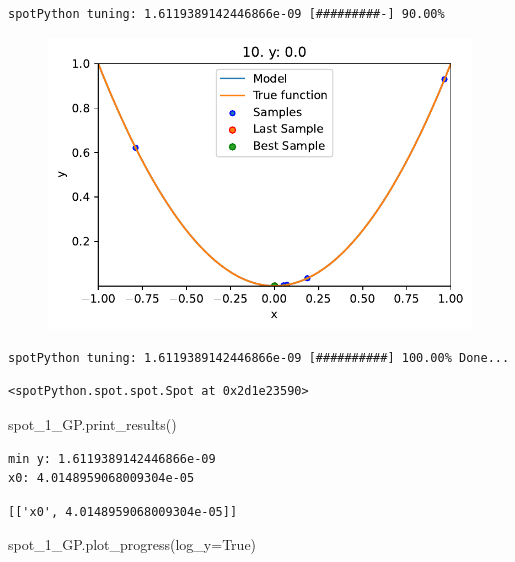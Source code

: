 \documentclass[
  letterpaper,
  DIV=11,
  numbers=noendperiod]{scrreprt}
\newenvironment{Shaded}{\begin{snugshade}}{\end{snugshade}}
\newcommand{\NormalTok}[1]{\textcolor[rgb]{0.00,0.23,0.31}{#1}}
\newcommand{\OperatorTok}[1]{\textcolor[rgb]{0.37,0.37,0.37}{#1}}
\newcommand{\VariableTok}[1]{\textcolor[rgb]{0.07,0.07,0.07}{#1}}
\begin{document}
\begin{verbatim}
spotPython tuning: 1.6119389142446866e-09 [#########-] 90.00% 
\end{verbatim}

\begin{figure}[H]

{\centering \includegraphics{010_num_spot_sklearn_surrogate_files/figure-pdf/cell-25-output-14.pdf}

}

\end{figure}

\begin{verbatim}
spotPython tuning: 1.6119389142446866e-09 [##########] 100.00% Done...
\end{verbatim}

\begin{verbatim}
<spotPython.spot.spot.Spot at 0x2d1e23590>
\end{verbatim}

\begin{Shaded}
\begin{Highlighting}[]
\NormalTok{spot\_1\_GP.print\_results()}
\end{Highlighting}
\end{Shaded}

\begin{verbatim}
min y: 1.6119389142446866e-09
x0: 4.0148959068009304e-05
\end{verbatim}

\begin{verbatim}
[['x0', 4.0148959068009304e-05]]
\end{verbatim}

\begin{Shaded}
\begin{Highlighting}[]
\NormalTok{spot\_1\_GP.plot\_progress(log\_y}\OperatorTok{=}\VariableTok{True}\NormalTok{)}
\end{Highlighting}
\end{Shaded}
\end{document}
